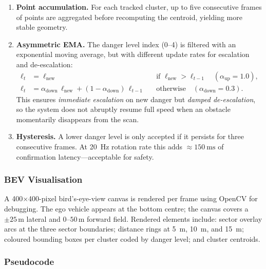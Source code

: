 \documentclass[12pt,a4paper]{article}
\begin{document}
\begin{enumerate}[nosep,label=\textbf{\arabic*.}]
  \item \textbf{Point accumulation.} For each tracked cluster, up to five
        consecutive frames of points are aggregated before recomputing the
        centroid, yielding more stable geometry.
  \item \textbf{Asymmetric EMA.} The danger level index (0--4) is filtered
        with an exponential moving average, but with different update rates for
        escalation and de-escalation:
        \begin{align}
          \ell_{t} &= \ell_{\text{new}} & &\text{if } \ell_{\text{new}}
                   > \ell_{t-1} \quad (\alpha_{\text{up}}=1.0),
          \label{eq:ema_up} \\
          \ell_{t} &= \alpha_{\text{down}}\,\ell_{\text{new}}
                    + (1-\alpha_{\text{down}})\,\ell_{t-1} & &\text{otherwise}
                   \quad (\alpha_{\text{down}}=0.3).
          \label{eq:ema_down}
        \end{align}
        This ensures \emph{immediate escalation} on new danger but
        \emph{damped de-escalation}, so the system does not abruptly resume
        full speed when an obstacle momentarily disappears from the scan.
  \item \textbf{Hysteresis.} A lower danger level is only accepted if it
        persists for three consecutive frames.  At \SI{20}{\hertz} rotation
        rate this adds $\approx\SI{150}{\milli\second}$ of confirmation
        latency---acceptable for safety.
\end{enumerate}

\subsubsection{BEV Visualisation}

A 400$\times$400-pixel bird's-eye-view canvas is rendered per frame using
OpenCV for debugging.  The ego vehicle appears at the bottom centre; the
canvas covers a $\pm25$\,m lateral and $0$--$50$\,m forward field.  Rendered
elements include: sector overlay arcs at the three sector boundaries; distance
rings at \SI{5}{\metre}, \SI{10}{\metre}, and \SI{15}{\metre}; coloured
bounding boxes per cluster coded by danger level; and cluster centroids.

\subsubsection{Pseudocode}
\end{document}
